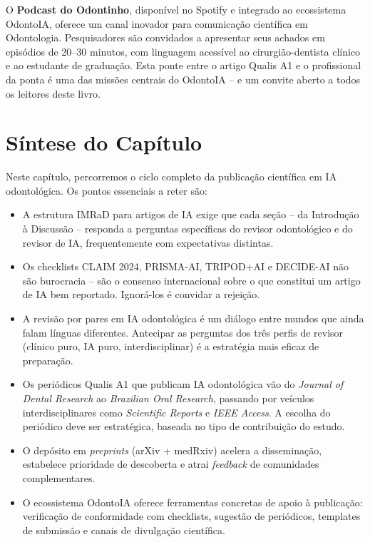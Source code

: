 O \textbf{Podcast do Odontinho}, disponível no Spotify e integrado ao
ecossistema OdontoIA, oferece um canal inovador para comunicação científica em
Odontologia. Pesquisadores são convidados a apresentar seus achados em episódios
de 20--30 minutos, com linguagem acessível ao cirurgião-dentista clínico e ao
estudante de graduação. Esta ponte entre o artigo Qualis A1 e o profissional da
ponta é uma das missões centrais do OdontoIA -- e um convite aberto a todos os
leitores deste livro.

\section{Síntese do Capítulo}

Neste capítulo, percorremos o ciclo completo da publicação científica em IA
odontológica. Os pontos essenciais a reter são:

\begin{itemize}
  \item A estrutura IMRaD para artigos de IA exige que cada seção -- da
    Introdução à Discussão -- responda a perguntas específicas do revisor
    odontológico e do revisor de IA, frequentemente com expectativas distintas.

  \item Os checklists CLAIM 2024, PRISMA-AI, TRIPOD+AI e DECIDE-AI não são
    burocracia -- são o consenso internacional sobre o que constitui um artigo
    de IA bem reportado. Ignorá-los é convidar a rejeição.

  \item A revisão por pares em IA odontológica é um diálogo entre mundos que
    ainda falam línguas diferentes. Antecipar as perguntas dos três perfis de
    revisor (clínico puro, IA puro, interdisciplinar) é a estratégia mais eficaz
    de preparação.

  \item Os periódicos Qualis A1 que publicam IA odontológica vão do
    \textit{Journal of Dental Research} ao \textit{Brazilian Oral Research},
    passando por veículos interdisciplinares como \textit{Scientific Reports} e
    \textit{IEEE Access}. A escolha do periódico deve ser estratégica, baseada
    no tipo de contribuição do estudo.

  \item O depósito em \textit{preprints} (arXiv + medRxiv) acelera a
    disseminação, estabelece prioridade de descoberta e atrai \textit{feedback}
    de comunidades complementares.

  \item O ecossistema OdontoIA oferece ferramentas concretas de apoio à
    publicação: verificação de conformidade com checklists, sugestão de
    periódicos, templates de submissão e canais de divulgação científica.
\end{itemize}

